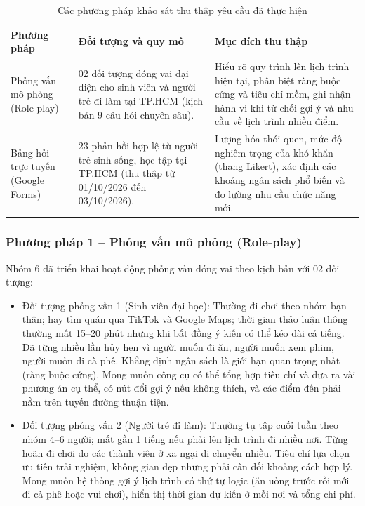 \documentclass[13pt,a4paper]{extreport}
\newcommand{\hd}[1]{\centering\arraybackslash\textbf{#1}}
\begin{document}
\begin{table}[H]
\centering
\caption{Các phương pháp khảo sát thu thập yêu cầu đã thực hiện}
\label{tab:methods}
\setlength{\tabcolsep}{4pt}
\begin{tabular}{|L{3.8cm}|L{4.5cm}|L{6.3cm}|}
\hline
\hd{Phương pháp} & \hd{Đối tượng và quy mô} & \hd{Mục đích thu thập} \\
\hline
Phỏng vấn mô phỏng (Role-play) &
02 đối tượng đóng vai đại diện cho sinh viên và người trẻ đi làm tại TP.HCM (kịch bản 9 câu hỏi chuyên sâu). &
Hiểu rõ quy trình lên lịch trình hiện tại, phân biệt ràng buộc cứng và tiêu chí mềm, ghi nhận hành vi khi từ chối gợi ý và nhu cầu về lịch trình nhiều điểm. \\
\hline
Bảng hỏi trực tuyến (Google Forms) &
23 phản hồi hợp lệ từ người trẻ sinh sống, học tập tại TP.HCM (thu thập từ 01/10/2026 đến 03/10/2026). &
Lượng hóa thói quen, mức độ nghiêm trọng của khó khăn (thang Likert), xác định các khoảng ngân sách phổ biến và đo lường nhu cầu chức năng mới. \\
\hline
\end{tabular}
\end{table}

\subsubsection{Phương pháp 1 -- Phỏng vấn mô phỏng (Role-play)}
Nhóm 6 đã triển khai hoạt động phỏng vấn đóng vai theo kịch bản với 02 đối tượng:
\begin{itemize}
    \item Đối tượng phỏng vấn 1 (Sinh viên đại học): Thường đi chơi theo nhóm bạn thân; hay tìm quán qua TikTok và Google Maps; thời gian thảo luận thông thường mất 15--20 phút nhưng khi bất đồng ý kiến có thể kéo dài cả tiếng. Đã từng nhiều lần hủy hẹn vì người muốn đi ăn, người muốn xem phim, người muốn đi cà phê. Khẳng định ngân sách là giới hạn quan trọng nhất (ràng buộc cứng). Mong muốn công cụ có thể tổng hợp tiêu chí và đưa ra vài phương án cụ thể, có nút đổi gợi ý nếu không thích, và các điểm đến phải nằm trên tuyến đường thuận tiện.
    \item Đối tượng phỏng vấn 2 (Người trẻ đi làm): Thường tụ tập cuối tuần theo nhóm 4--6 người; mất gần 1 tiếng nếu phải lên lịch trình đi nhiều nơi. Từng hoãn đi chơi do các thành viên ở xa ngại di chuyển nhiều. Tiêu chí lựa chọn ưu tiên trải nghiệm, không gian đẹp nhưng phải cân đối khoảng cách hợp lý. Mong muốn hệ thống gợi ý lịch trình có thứ tự logic (ăn uống trước rồi mới đi cà phê hoặc vui chơi), hiển thị thời gian dự kiến ở mỗi nơi và tổng chi phí.
\end{itemize}
\end{document}
